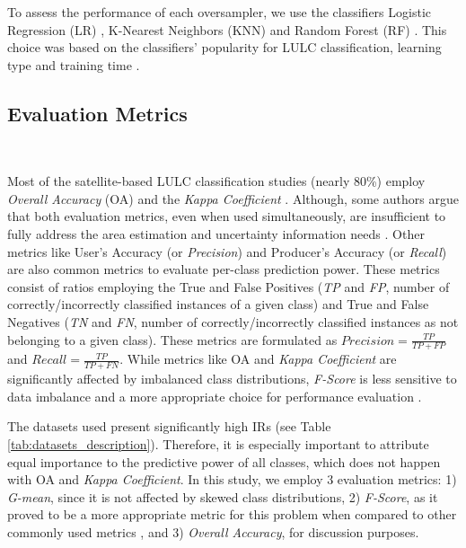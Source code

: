 \documentclass[preprint,12pt]{elsarticle}
\begin{document}
To assess the performance of each oversampler, we use the classifiers Logistic
Regression (LR) \cite{Nelder1972}, K-Nearest Neighbors (KNN)
\cite{Cover1967} and Random Forest (RF)
\cite{Liaw2002}. This choice was based on the classifiers' popularity for LULC
classification, learning type and training time \cite{Maxwell2018,Gavade2019}.

\subsection{Evaluation Metrics}~\label{sec:evaluation-metrics}

Most of the satellite-based LULC classification studies (nearly 80\%) employ
\textit{Overall Accuracy} (OA) and the \textit{Kappa Coefficient}
\cite{Gavade2019}. Although, some authors argue that both evaluation metrics,
even when used simultaneously, are insufficient to fully address the area
estimation and uncertainty information needs \cite{Olofsson2013,Pontius2011}.
Other metrics like User's Accuracy (or \textit{Precision}) and Producer's
Accuracy (or \textit{Recall}) are also common metrics to evaluate per-class
prediction power. These metrics consist of ratios employing the True and False
Positives (\textit{TP} and \textit{FP}, number of correctly/incorrectly
classified instances of a given class) and True and
False Negatives (\textit{TN} and \textit{FN}, number of correctly/incorrectly
classified instances as not belonging to a given
class). These metrics are formulated as $Precision = \frac{TP}{TP+FP}$ and
$Recall = \frac{TP}{TP+FN}$. While metrics like OA and \textit{Kappa
Coefficient} are significantly affected by imbalanced class distributions,
\textit{F-Score} is less sensitive to data imbalance and a more appropriate
choice for performance evaluation \cite{Jeni2013}.

The datasets used present significantly high IRs (see Table
\ref{tab:datasets_description}). Therefore, it is especially important to
attribute equal importance to the predictive power of all classes, which does
not happen with OA and \textit{Kappa Coefficient}. In this study, we employ 3
evaluation metrics: 1) \textit{G-mean}, since it is not affected by skewed class
distributions, 2) \textit{F-Score}, as it proved to be a more appropriate metric
for this problem when compared to other commonly used metrics \cite{Jeni2013},
and 3) \textit{Overall Accuracy}, for discussion purposes.
\end{document}
